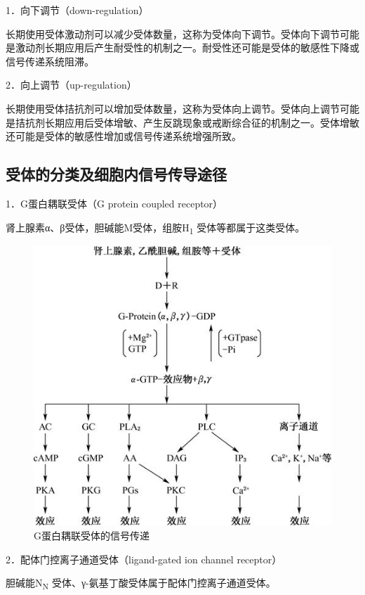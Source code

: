 1．向下调节（down-regulation）

长期使用受体激动剂可以减少受体数量，这称为受体向下调节。受体向下调节可能是激动剂长期应用后产生耐受性的机制之一。耐受性还可能是受体的敏感性下降或信号传递系统阻滞。

2．向上调节（up-regulation）

长期使用受体拮抗剂可以增加受体数量，这称为受体向上调节。受体向上调节可能是拮抗剂长期应用后受体增敏、产生反跳现象或戒断综合征的机制之一。受体增敏还可能是受体的敏感性增加或信号传递系统增强所致。

\subsection{受体的分类及细胞内信号传导途径}

1．G蛋白耦联受体（G protein coupled receptor）

肾上腺素α、β受体，胆碱能M受体，组胺H\textsubscript{1}
受体等都属于这类受体。

\begin{figure}[!htbp]
 \centering
 \includegraphics{./images/Image00019.jpg}
 \captionsetup{justification=centering}
 \caption{G蛋白耦联受体的信号传递}
 \label{fig2-10}
  \end{figure} 

2．配体门控离子通道受体（ligand-gated ion channel receptor）

胆碱能N\textsubscript{N} 受体、γ-氨基丁酸受体属于配体门控离子通道受体。

